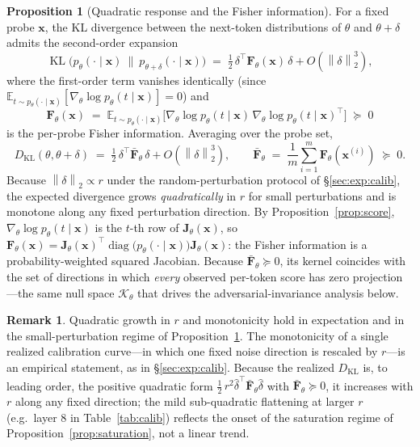 \documentclass[11pt]{article}
\newcommand{\E}{\mathbb{E}}
\newcommand{\norm}[1]{\left\lVert #1 \right\rVert}
\newcommand{\KL}{\operatorname{KL}}
\theoremstyle{definition}
\newtheorem{proposition}{Proposition}
\newtheorem{remark}{Remark}
\begin{document}
\begin{proposition}[Quadratic response and the Fisher information]
\label{prop:fisher}
For a fixed probe $\bm{x}$, the KL divergence between the next-token
distributions of $\theta$ and $\theta + \delta$ admits the second-order
expansion
\begin{equation}
  \KL\!\big(p_\theta(\cdot \mid \bm{x})\ \|\ p_{\theta+\delta}(\cdot \mid \bm{x})\big)
  \;=\; \tfrac12\, \delta^\top \bm{F}_\theta(\bm{x})\, \delta
      + O(\norm{\delta}_2^3),
  \label{eq:fisherexpand}
\end{equation}
where the first-order term vanishes identically (since
$\E_{t \sim p_\theta(\cdot \mid \bm{x})}[\nabla_\theta \log p_\theta(t \mid \bm{x})] = 0$)
and
\begin{equation}
  \bm{F}_\theta(\bm{x})
  \;=\; \E_{t \sim p_\theta(\cdot \mid \bm{x})}
      \big[\nabla_\theta \log p_\theta(t \mid \bm{x})
          \,\nabla_\theta \log p_\theta(t \mid \bm{x})^\top\big]
  \;\succeq\; 0
  \label{eq:fisher}
\end{equation}
is the per-probe Fisher information. Averaging over the probe set,
\begin{equation}
  D_{\mathrm{KL}}(\theta, \theta+\delta)
  \;=\; \tfrac12\, \delta^\top \bar{\bm{F}}_\theta\, \delta
      + O(\norm{\delta}_2^3),
  \qquad
  \bar{\bm{F}}_\theta \;=\; \frac1m \sum_{i=1}^m \bm{F}_\theta(\bm{x}^{(i)})
  \;\succeq\; 0.
  \label{eq:dklexpand}
\end{equation}
Because $\norm{\delta}_2 \propto r$ under the random-perturbation protocol of
\S\ref{sec:exp:calib}, the expected divergence grows \emph{quadratically} in
$r$ for small perturbations and is monotone along any fixed perturbation
direction. By Proposition~\ref{prop:score},
$\nabla_\theta \log p_\theta(t \mid \bm{x})$ is the $t$-th row of
$\bm{J}_\theta(\bm{x})$, so
$\bm{F}_\theta(\bm{x}) = \bm{J}_\theta(\bm{x})^\top
\operatorname{diag}\!\big(p_\theta(\cdot \mid \bm{x})\big)
\bm{J}_\theta(\bm{x})$: the Fisher information is a probability-weighted squared
Jacobian. Because $\bar{\bm{F}}_\theta \succeq 0$, its kernel coincides with the
set of directions in which \emph{every} observed per-token score has zero
projection---the same null space $\mathcal{K}_\theta$ that drives the
adversarial-invariance analysis below.
\end{proposition}

\begin{remark}
\label{rem:linearity}
Quadratic growth in $r$ and monotonicity hold in expectation and in the
small-perturbation regime of Proposition~\ref{prop:fisher}. The monotonicity of
a single realized calibration curve---in which one fixed noise direction is
rescaled by $r$---is an empirical statement, as in \S\ref{sec:exp:calib}.
Because the realized $D_{\mathrm{KL}}$ is, to leading order, the positive
quadratic form $\tfrac12\, r^2 \hat\delta^\top \bar{\bm{F}}_\theta \hat\delta$
with $\bar{\bm{F}}_\theta \succeq 0$, it increases with $r$ along any fixed
direction; the mild sub-quadratic flattening at larger $r$ (e.g.\ layer $8$ in
Table~\ref{tab:calib}) reflects the onset of the saturation regime of
Proposition~\ref{prop:saturation}, not a linear trend.
\end{remark}
\end{document}
